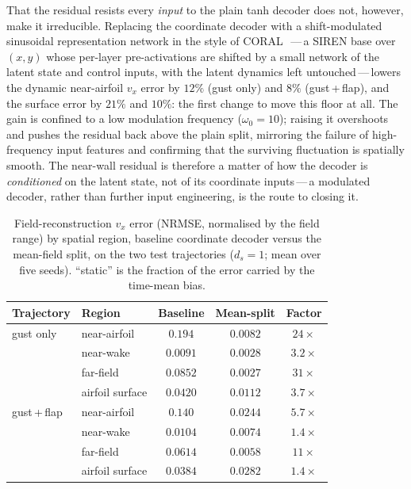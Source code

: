 That the residual resists every \emph{input} to the plain tanh decoder does not,
however, make it irreducible. Replacing the coordinate decoder with a shift-modulated
sinusoidal representation network in the style of CORAL~\cite{Serrano2023}\,---\,a SIREN
base over $(x,y)$ whose per-layer pre-activations are shifted by a small network of the
latent state and control inputs, with the latent dynamics left untouched\,---\,lowers the
dynamic near-airfoil $v_x$ error by $12\%$ (gust only) and $8\%$ (gust\,+\,flap), and the
surface error by $21\%$ and $10\%$: the first change to move this floor at all. The gain
is confined to a low modulation frequency ($\omega_0=10$); raising it overshoots and
pushes the residual back above the plain split, mirroring the failure of high-frequency
input features and confirming that the surviving fluctuation is spatially smooth. The
near-wall residual is therefore a matter of how the decoder is \emph{conditioned} on the
latent state, not of its coordinate inputs\,---\,a modulated decoder, rather than further
input engineering, is the route to closing it.

\begin{table}[htbp]
\centering
\caption{Field-reconstruction $v_x$ error (NRMSE, normalised by the field range) by
spatial region, baseline coordinate decoder versus the mean-field split, on the two
test trajectories ($d_s=1$; mean over five seeds). ``static'' is the fraction of the
error carried by the time-mean bias.}
\label{tab:meansplit}
\begin{tabular}{llccc}
\toprule
Trajectory & Region & Baseline & Mean-split & Factor \\
\midrule
gust only
 & near-airfoil    & $0.194$ & $0.0082$ & $24\times$ \\
 & near-wake       & $0.0091$ & $0.0028$ & $3.2\times$ \\
 & far-field       & $0.0852$ & $0.0027$ & $31\times$ \\
 & airfoil surface & $0.0420$ & $0.0112$ & $3.7\times$ \\
\midrule
gust\,+\,flap
 & near-airfoil    & $0.140$ & $0.0244$ & $5.7\times$ \\
 & near-wake       & $0.0104$ & $0.0074$ & $1.4\times$ \\
 & far-field       & $0.0614$ & $0.0058$ & $11\times$ \\
 & airfoil surface & $0.0384$ & $0.0282$ & $1.4\times$ \\
\bottomrule
\end{tabular}
\end{table}

